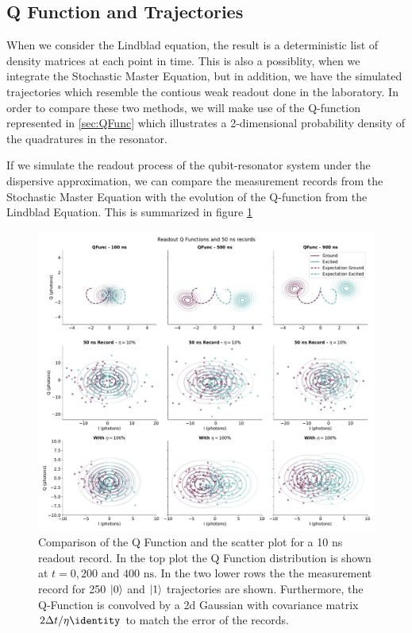 
\FloatBarrier

\subsection{Q Function and Trajectories}
When we consider the Lindblad equation, the result is a deterministic list of density matrices at each point in time. This is also a possiblity, when we integrate the Stochastic Master Equation, but in addition, we have the simulated trajectories which resemble the contious weak readout done in the laboratory. In order to compare these two methods, we will make use of the Q-function represented in \ref{sec:QFunc} which illustrates a 2-dimensional probability density of the quadratures in the resonator. 

If we simulate the readout process of the qubit-resonator system under the dispersive approximation, we can compare the measurement records from the Stochastic Master Equation with the evolution of the Q-function from the Lindblad Equation. This is summarized in figure \ref{fig:trajectories_and_qfunc}

\begin{figure}[h]
    \centering
    \includegraphics[]{Simulations/readout_simulations/figures/qfunc_trajectories.pdf}
    \caption{Comparison of the Q Function and the scatter plot for a 10 ns readout record. In the top plot the Q Function distribution is shown at $t = 0, 200$ and $400 \text{ ns}$. In the two lower rows the the measurement record for 250 $\ket{0}$ and $\ket{1}$ trajectories are shown. Furthermore, the Q-Function is convolved by a 2d Gaussian with covariance matrix $2 \Delta t / \eta \identity$ to match the error of the records.}
    \label{fig:trajectories_and_qfunc}
\end{figure}

